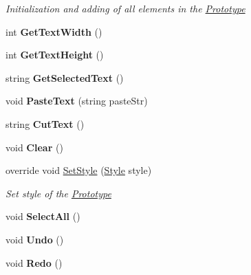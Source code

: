 \begin{DoxyCompactItemize}
\begin{DoxyCompactList}\small\item\em Initialization and adding of all elements in the \mbox{\hyperlink{class_space_v_i_l_1_1_prototype}{Prototype}} \end{DoxyCompactList}\item 
\mbox{\label{class_space_v_i_l_1_1_text_edit_ab3e6d3c87badb11c014288064bfe74b5}} 
int {\bfseries Get\+Text\+Width} ()
\item 
\mbox{\label{class_space_v_i_l_1_1_text_edit_a8fa34c4f7908b091eeacd94390343a61}} 
int {\bfseries Get\+Text\+Height} ()
\item 
\mbox{\label{class_space_v_i_l_1_1_text_edit_a038e5e4f0a26d1e6e60b130c33d1475e}} 
string {\bfseries Get\+Selected\+Text} ()
\item 
\mbox{\label{class_space_v_i_l_1_1_text_edit_ae77d47ae0954c456f39b653a65774d95}} 
void {\bfseries Paste\+Text} (string paste\+Str)
\item 
\mbox{\label{class_space_v_i_l_1_1_text_edit_ac1255a3e141988bb0c072b81b07a70ff}} 
string {\bfseries Cut\+Text} ()
\item 
\mbox{\label{class_space_v_i_l_1_1_text_edit_a80eff22d41fea8bd8f33bf6104d5a3c0}} 
void {\bfseries Clear} ()
\item 
override void \mbox{\hyperlink{class_space_v_i_l_1_1_text_edit_ac587be091aa4d1525dfcec90d6105073}{Set\+Style}} (\mbox{\hyperlink{class_space_v_i_l_1_1_decorations_1_1_style}{Style}} style)
\begin{DoxyCompactList}\small\item\em Set style of the \mbox{\hyperlink{class_space_v_i_l_1_1_prototype}{Prototype}} \end{DoxyCompactList}\item 
\mbox{\label{class_space_v_i_l_1_1_text_edit_aa7ae050e3de8833c92778dd72472f6ae}} 
void {\bfseries Select\+All} ()
\item 
\mbox{\label{class_space_v_i_l_1_1_text_edit_a0e206c2f3a49d34b9760647ee1b06e72}} 
void {\bfseries Undo} ()
\item 
\mbox{\label{class_space_v_i_l_1_1_text_edit_aceaa334f5a9cb74631d87d68cb53314c}} 
void {\bfseries Redo} ()
\end{DoxyCompactItemize}
